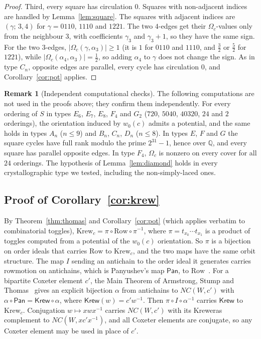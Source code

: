 \documentclass[11pt]{amsart}
\theoremstyle{definition}
\newtheorem{remark}[theorem]{Remark}
\newcommand{\Row}{\mathrm{Row}}
\begin{document}
\begin{proof}
Third, every square has circulation $0$. Squares with non-adjacent indices are handled by Lemma~\ref{lem:square}. The squares with adjacent indices are $(\gamma;\,3,4)$ for $\gamma=0110$, $1110$ and $1221$. The two $4$-edges get their $\Omega_c$-values only from the neighbour $3$, with coefficients $\gamma_3$ and $\gamma_3+1$, so they have the same sign. For the two $3$-edges, $|\Omega_c(\gamma,\alpha_3)|\ge1$ (it is $1$ for $0110$ and $1110$, and $\tfrac32$ or $\tfrac52$ for $1221$), while $|\Omega_c(\alpha_4,\alpha_3)|=\tfrac12$, so adding $\alpha_4$ to $\gamma$ does not change the sign. As in type $C_n$, opposite edges are parallel, every cycle has circulation $0$, and Corollary~\ref{cor:pot} applies.
\end{proof}

\begin{remark}[Independent computational checks]\label{rem:other}
The following computations are not used in the proofs above; they confirm them independently. For every ordering of $S$ in types $E_6$, $E_7$, $E_8$, $F_4$ and $G_2$ ($720$, $5040$, $40320$, $24$ and $2$ orderings), the orientation induced by $w_0(c)$ admits a potential, and the same holds in types $A_n$ ($n\le9$) and $B_n$, $C_n$, $D_n$ ($n\le8$). In types $E$, $F$ and $G$ the square cycles have full rank modulo the prime $2^{31}-1$, hence over $\mathbb Q$, and every square has parallel opposite edges. In type $F_4$, $\Omega_c$ is nonzero on every cover for all $24$ orderings. The hypothesis of Lemma~\ref{lem:diamond} holds in every crystallographic type we tested, including the non-simply-laced ones.
\end{remark}

\subsection*{Proof of Corollary~\ref{cor:krew}}
By Theorem~\ref{thm:thomas} and Corollary~\ref{cor:pot} (which applies verbatim to combinatorial toggles), $\mathrm{Krew}_c=\pi\circ\Row\circ\pi^{-1}$, where $\pi=t_{x_k}\cdots t_{x_1}$ is a product of toggles computed from a potential of the $w_0(c)$ orientation. So $\pi$ is a bijection on order ideals that carries $\Row$ to $\mathrm{Krew}_c$, and the two maps have the same orbit structure. The map $I$ sending an antichain to the order ideal it generates carries rowmotion on antichains, which is Panyushev's map $\mathsf{Pan}$, to $\Row$~\cite{CFF}. For a bipartite Coxeter element $c'$, the Main Theorem of Armstrong, Stump and Thomas~\cite[\S1.3]{AST} gives an explicit bijection $\alpha$ from antichains to $NC(W,c')$ with $\alpha\circ\mathsf{Pan}=\mathsf{Krew}\circ\alpha$, where $\mathsf{Krew}(w)=c'w^{-1}$. Then $\pi\circ I\circ\alpha^{-1}$ carries $\mathsf{Krew}$ to $\mathrm{Krew}_c$. Conjugation $w\mapsto xwx^{-1}$ carries $NC(W,c')$ with its Kreweras complement to $NC(W,xc'x^{-1})$, and all Coxeter elements are conjugate, so any Coxeter element may be used in place of $c'$.
\end{document}
